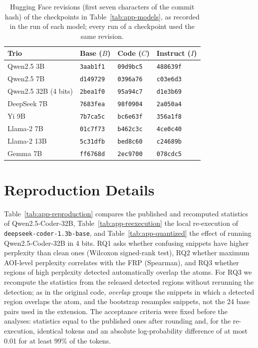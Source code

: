 \begin{table}[H]
  \caption{Hugging Face revisions (first seven characters of the commit hash) of the checkpoints in Table~\ref{tab:app-models}, as recorded in the run of each model; every run of a checkpoint used the same revision.}
  \label{tab:app-revisions}
  \centering
  \footnotesize
  \begin{tabular}{llll}
    \toprule
    Trio & Base ($B$) & Code ($C$) & Instruct ($I$) \\
    \midrule
    Qwen2.5 3B & \texttt{3aab1f1} & \texttt{09d9bc5} & \texttt{488639f} \\
    Qwen2.5 7B & \texttt{d149729} & \texttt{0396a76} & \texttt{c03e6d3} \\
    Qwen2.5 32B (4 bits) & \texttt{2bea1f0} & \texttt{95a94c7} & \texttt{d1e3b69} \\
    DeepSeek 7B & \texttt{7683fea} & \texttt{98f0904} & \texttt{2a050a4} \\
    Yi 9B & \texttt{7b7ca5c} & \texttt{bc6e63f} & \texttt{356a1f8} \\
    Llama-2 7B & \texttt{01c7f73} & \texttt{b462c3c} & \texttt{4ce0c40} \\
    Llama-2 13B & \texttt{5c31dfb} & \texttt{bed8c60} & \texttt{c24689b} \\
    Gemma 7B & \texttt{ff6768d} & \texttt{2ec9700} & \texttt{078cdc5} \\
    \bottomrule
  \end{tabular}
\end{table}

\clearpage
\section{Reproduction Details}
\label{app:reproduction}

Table~\ref{tab:app-reproduction} compares the published and recomputed statistics of Qwen2.5-Coder-32B, Table~\ref{tab:app-reexecution} the local re-execution of \texttt{deepseek-coder-1.3b-base}, and Table~\ref{tab:app-quantized} the effect of running Qwen2.5-Coder-32B in 4 bits.
RQ1 asks whether confusing snippets have higher perplexity than clean ones (Wilcoxon signed-rank test), RQ2 whether maximum AOI-level perplexity correlates with the FRP (Spearman), and RQ3 whether regions of high perplexity detected automatically overlap the atoms.
For RQ3 we recompute the statistics from the released detected regions without rerunning the detection; as in the original code, \emph{overlap} groups the snippets in which a detected region overlaps the atom, and the bootstrap resamples snippets, not the 24 base pairs used in the extension.
The acceptance criteria were fixed before the analyses: statistics equal to the published ones after rounding and, for the re-execution, identical tokens and an absolute log-probability difference of at most 0.01 for at least 99\% of the tokens.

